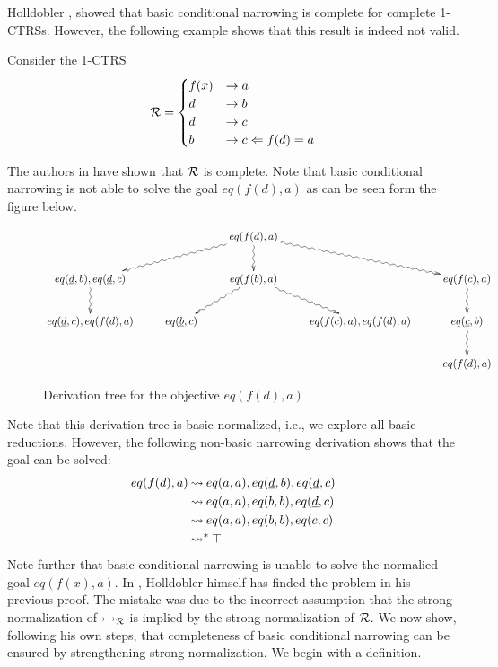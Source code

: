 Holldobler \cite{Holldobler:1989:FEL:76924}, showed that basic conditional narrowing is complete for complete 1-CTRSs. However, the following example shows that this result is indeed not valid.

\begin{example}
    Consider the 1-CTRS
    \begin{displaymath}
        \mathcal{R} =
        \begin{cases}
            f(x) & \rightarrow a                               \\
            d & \rightarrow b \\
            d & \rightarrow c\\
            b & \rightarrow c \Leftarrow f(d) = a
        \end{cases}
    \end{displaymath}
\end{example}

The authors in \cite{Middeldorp1994} have shown that $\mathcal{R}$ is complete. Note that basic conditional narrowing is not able to solve the goal $eq(f(d),a)$ as can be seen form the figure below.

\begin{figure}[!ht]
    \begin{displaymath}
        \xymatrix{
            & & eq(f(d),a) \ar@{~>}[dll] \ar@{~>}[drr] \ar@{~>}[d] &  & \\
            eq(\underline{d},b),eq(\underline{d},c) \ar@{~>}[d] & & eq(f(b),a) \ar@{~>}[dl] \ar@{~>}[dr] & & eq(f(c),a) \ar@{~>}[d] \\
            eq(\underline{d},c), eq(f(d),a) &  eq(\underline{b},c) &  & eq(f(c),a), eq(f(d),a) & eq(\underline{c},b) \ar@{~>}[d]\\
            & & & & eq(f(d),a)
        }
    \end{displaymath}
    \caption{Derivation tree for the objective $eq(f(d),a)$}
    \label{figure:counterexample-basic-conditional-narrowing}
\end{figure}
Note that this derivation tree is basic-normalized, i.e., we explore all basic reductions. However, the following non-basic narrowing derivation shows that the goal can be solved:
\begin{align*}
    eq(f(d),a) &\mathbin{\rightsquigarrow} eq(a,a), eq(\underline{d},b), eq(\underline{d},c) \\
    & \mathbin{\rightsquigarrow} eq(a,a), eq(b,b), eq(\underline{d},c) \\
    & \mathbin{\rightsquigarrow} eq(a,a), eq(b,b), eq(c,c) \\
    & \mathbin{\rightsquigarrow}^* \top
\end{align*}
Note further that basic conditional narrowing is unable to solve the normalied goal $eq(f(x),a)$. In \cite{Middeldorp1994}, Holldobler himself has finded the problem in his previous proof. The mistake was due to the incorrect assumption that the strong normalization of $\rightarrowtail_{\mathcal{R}}$ is implied by the strong normalization of $\mathcal{R}$. We now show, following his own steps, that completeness of basic conditional narrowing can be ensured by strengthening strong normalization. We begin with a definition.

